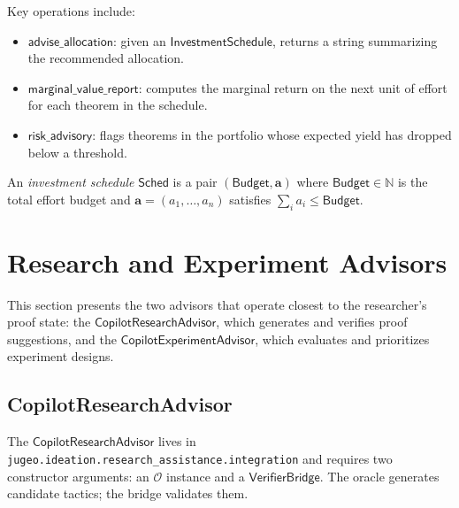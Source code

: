 \documentclass[11pt]{article}
\newcommand{\Oracle}{\mathcal{O}}
\newcommand{\Budget}{\mathsf{Budget}}
\newcommand{\Schedule}{\mathsf{Sched}}
\begin{document}
Key operations include:
\begin{itemize}
  \item $\mathsf{advise\_allocation}$: given an
        $\mathsf{InvestmentSchedule}$, returns a string
        summarizing the recommended allocation.
  \item $\mathsf{marginal\_value\_report}$: computes the
        marginal return on the next unit of effort for each
        theorem in the schedule.
  \item $\mathsf{risk\_advisory}$: flags theorems in the
        portfolio whose expected yield has dropped below a
        threshold.
\end{itemize}

\begin{definition}\label{def:investment-schedule}
An \emph{investment schedule} $\Schedule$ is a pair
$(\Budget, \mathbf{a})$ where $\Budget \in \mathbb{N}$ is the
total effort budget and $\mathbf{a} = (a_1, \ldots, a_n)$
satisfies $\sum_i a_i \leq \Budget$.
\end{definition}

\section{Research and Experiment Advisors}
\label{sec:research-experiment}

This section presents the two advisors that operate closest to the
researcher's proof state: the $\mathsf{CopilotResearchAdvisor}$,
which generates and verifies proof suggestions, and the
$\mathsf{CopilotExperimentAdvisor}$, which evaluates and
prioritizes experiment designs.

\subsection{CopilotResearchAdvisor}\label{sec:research-advisor}

The $\mathsf{CopilotResearchAdvisor}$ lives in
\texttt{jugeo.ideation.research\_assistance.integration} and
requires two constructor arguments: an $\Oracle$ instance and a
$\mathsf{VerifierBridge}$.  The oracle generates candidate
tactics; the bridge validates them.
\end{document}

